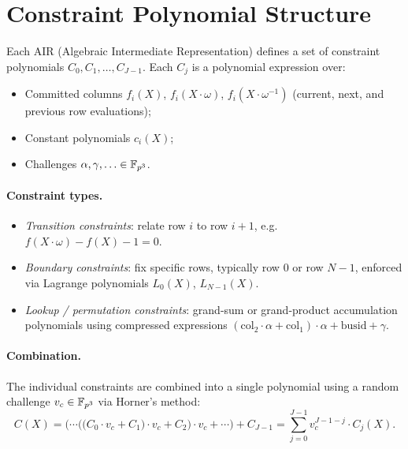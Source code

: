 
\section{Constraint Polynomial Structure}
\label{app:constraints}

Each AIR (Algebraic Intermediate Representation) defines a set of constraint
polynomials $C_0, C_1, \ldots, C_{J-1}$.
Each $C_j$ is a polynomial expression over:
\begin{itemize}[nosep]
  \item Committed columns $f_i(X)$, $f_i(X \cdot \omega)$, $f_i(X \cdot \omega^{-1})$
        (current, next, and previous row evaluations);
  \item Constant polynomials $c_i(X)$;
  \item Challenges $\alpha, \gamma, \ldots \in \mathbb{F}_{p^3}$.
\end{itemize}

\paragraph{Constraint types.}
\begin{itemize}[nosep]
  \item \emph{Transition constraints}: relate row $i$ to row $i+1$,
        e.g.\ $f(X \cdot \omega) - f(X) - 1 = 0$.
  \item \emph{Boundary constraints}: fix specific rows,
        typically row $0$ or row $N-1$,
        enforced via Lagrange polynomials $L_0(X)$, $L_{N-1}(X)$.
  \item \emph{Lookup / permutation constraints}:
        grand-sum or grand-product accumulation polynomials
        using compressed expressions
        $(\text{col}_2 \cdot \alpha + \text{col}_1) \cdot \alpha + \text{busid} + \gamma$.
\end{itemize}

\paragraph{Combination.}
The individual constraints are combined into a single polynomial using
a random challenge $v_c \in \mathbb{F}_{p^3}$ via Horner's method:
\begin{equation}
  \label{eq:combine}
  C(X) = \bigl(\cdots\bigl(\bigl(C_0 \cdot v_c + C_1\bigr) \cdot v_c + C_2\bigr)
         \cdot v_c + \cdots\bigr) + C_{J-1}
       = \sum_{j=0}^{J-1} v_c^{J-1-j} \cdot C_j(X).
\end{equation}

